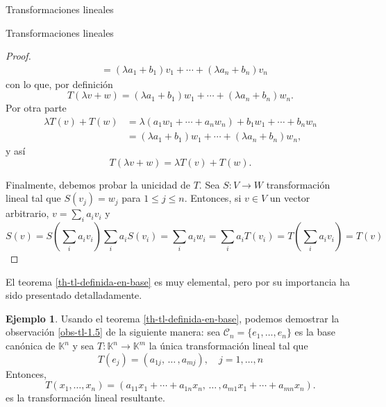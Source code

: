 \documentclass[a4paper,12pt,twoside,spanish,reqno]{amsbook}
\theoremstyle{definition}
\newtheorem{ejemplo}{Ejemplo}[section]
\theoremstyle{remark}
\newcommand{\K}{\mathbb K}
\begin{document}
\begin{chapter}{Transformaciones lineales}
\begin{section}{Transformaciones lineales}
\begin{proof}
\begin{align*}
                    &= (\lambda a_1+b_1)v_1 + \cdots+(\lambda a_n+b_n)v_n
                \end{align*}
                con lo que, por definición
                \begin{equation*}
                    T(\lambda v+w) =(\lambda a_1+b_1)w_1 + \cdots+(\lambda a_n+b_n)w_n. 
                \end{equation*}
                Por otra parte
                \begin{align*}
                \lambda  T(v) + T(w) &= \lambda (a_1w_1 + \cdots+a_n w_n)+b_1w_1 + \cdots+b_n w_n	 \\
                 &=(\lambda a_1+b_1)w_1 + \cdots+(\lambda a_n+b_n)w_n ,			
                \end{align*}
                y así
                \begin{equation*}
                    T(\lambda v+w) = 	\lambda  T(v) + T(w).
                \end{equation*}
                
                Finalmente,  debemos probar la unicidad de $T$. Sea $S: V \to W$ transformación lineal tal que $S(v_j) = w_j$ para $1 \le j \le n$. Entonces,  si $v \in V$ un vector arbitrario, $v = \sum_i a_i v_i$ y
                \begin{equation*}
                    S(v) = S(\sum_i a_i v_i)\sum_i a_i S( v_i) = \sum_i a_iw_i = 
                     \sum_i a_i T( v_i) =  T(\sum_i a_i v_i) = T(v)
                \end{equation*}
            \end{proof}
        
        El teorema \ref{th-tl-definida-en-base} es muy elemental, pero por su importancia ha sido presentado
        detalladamente. 
        
            \begin{ejemplo} Usando el teorema \ref{th-tl-definida-en-base}, podemos demostrar la observación \ref{obs-tl-1.5} de la siguiente manera: sea  $\mathcal C_n = \{e_1,\ldots,e_n\}$ es la base canónica de $\K^n$ y  sea  $T: \K^n \to \K^m$ la única transformación lineal tal que 
            \begin{equation*}
            T(e_j)  = (a_{1j},\, \ldots\,,a_{mj} ), \quad j=1,\ldots,n
            \end{equation*}	
            Entonces, 
            \begin{equation*}
            T(x_1,\ldots,x_n) = (a_{11}x_1+\cdots + a_{1n}x_n,\, \ldots\,,a_{m1}x_1+\cdots + a_{mn}x_n ).
            \end{equation*}
            es la transformación lineal resultante.
        \end{ejemplo}
        

\end{section}
\end{chapter}
\end{document}
